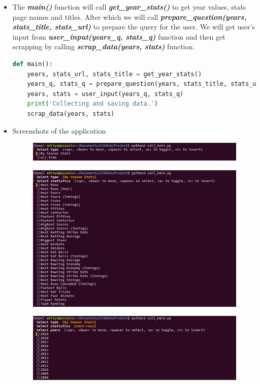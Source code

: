 \documentclass[12pt]{article}
\begin{document}
\begin{itemize}
	\item The \textbf{\textit{main()}} function will call \textbf{\textit{get\_year\_stats()}} to get year values, stats page names and titles.
	After which we will call \textbf{\textit{prepare\_question(years, stats\_title, stats\_url)}} to prepare the query for the user. We will get user’s input from \textbf{\textit{user\_input(years\_q, stats\_q)}} function and then get scrapping by calling \textbf{\textit{scrap\_data(years, stats)}} function.
	\begin{lstlisting}[language=Python]
def main():
	years, stats_url, stats_title = get_year_stats()
	years_q, stats_q = prepare_question(years, stats_title, stats_url)
	years, stats = user_input(years_q, stats_q)
	print('Collecting and saving data.')
	scrap_data(years, stats)
	\end{lstlisting}
	
	\item Screenshots of the application
	\begin{figure}[h]
		\centering
		\includegraphics[scale=0.5]{app1.png}
	\end{figure}
	\begin{figure}[h]
		\centering
		\includegraphics[scale=0.5]{app2.png}
	\end{figure}
	\begin{figure}[h]
		\centering
		\includegraphics[scale=0.5]{app3.png}
	\end{figure}
	
	\end{itemize}
\end{document}
